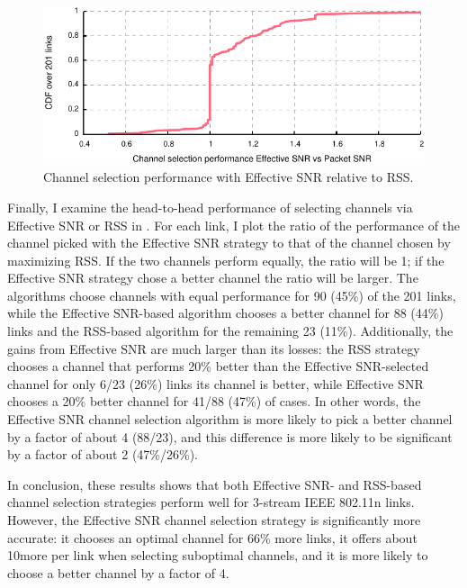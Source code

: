 \begin{figure}[htp]
	\centering
	\includegraphics[width=\textwidth]{figures/applications/chan_sel_ratio.pdf}
	\caption{\label{fig:chan_sel_ratio}Channel selection performance with Effective SNR relative to RSS\@.}
\end{figure}

Finally, I examine the head-to-head performance of selecting channels via Effective SNR or RSS in . For each link, I plot the ratio of the performance of the channel picked with the Effective SNR strategy to that of the channel chosen by maximizing RSS\@. If the two channels perform equally, the ratio will be 1; if the Effective SNR strategy chose a better channel the ratio will be larger. The algorithms choose channels with equal performance for 90 (45\%) of the 201 links, while the Effective SNR-based algorithm chooses a better channel for 88 (44\%) links and the RSS-based algorithm for the remaining 23 (11\%). Additionally, the gains from Effective SNR are much larger than its losses: the RSS strategy chooses a channel that performs 20\% better than the Effective SNR-selected channel for only 6/23 (26\%) links its channel is better, while Effective SNR chooses a 20\% better channel for 41/88 (47\%) of cases. In other words, the Effective SNR channel selection algorithm is more likely to pick a better channel by a factor of about 4 (88/23), and this difference is more likely to be significant by a factor of about 2 (47\%/26\%).

In conclusion, these results shows that both Effective SNR- and RSS-based channel selection strategies perform well for 3-stream IEEE 802.11n links. However, the Effective SNR channel selection strategy is significantly more accurate: it chooses an optimal channel for 66\% more links, it offers about 10\Mbps more per link when selecting suboptimal channels, and it is more likely to choose a better channel by a factor of 4.

